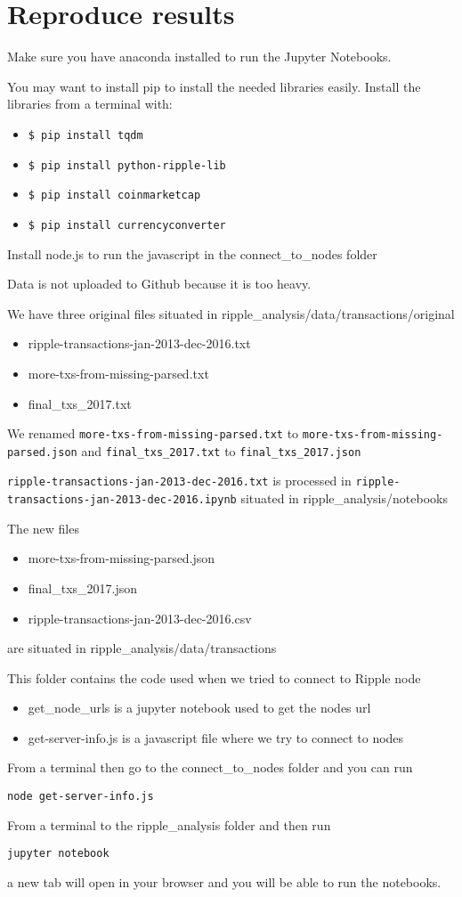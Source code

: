 \section{Reproduce results}
Make sure you have anaconda  installed to run the Jupyter Notebooks.

You may want to install pip  to install the needed libraries easily.
Install the libraries from a terminal with:
\begin{itemize}
\item \texttt{\$ pip install tqdm}
\item \texttt{\$ pip install python-ripple-lib}
\item \texttt{\$ pip install coinmarketcap}
\item \texttt{\$ pip install currencyconverter}
\end{itemize}

Install node.js  to run the javascript in the connect\_to\_nodes folder

Data is not uploaded to Github because it is too heavy.

We have three original files situated in ripple\_analysis/data/transactions/original
\begin{itemize}
\item ripple-transactions-jan-2013-dec-2016.txt
\item more-txs-from-missing-parsed.txt
\item final\_txs\_2017.txt
\end{itemize}

We renamed \texttt{more-txs-from-missing-parsed.txt} to \texttt{more-txs-from-missing-parsed.json} and \texttt{final\_txs\_2017.txt} to \texttt{final\_txs\_2017.json}

\texttt{ripple-transactions-jan-2013-dec-2016.txt} is processed in \texttt{ripple-transactions-jan-2013-dec-2016.ipynb} situated in ripple\_analysis/notebooks

The new files
\begin{itemize}
\item more-txs-from-missing-parsed.json
\item final\_txs\_2017.json
\item ripple-transactions-jan-2013-dec-2016.csv
\end{itemize}
are situated in ripple\_analysis/data/transactions

This folder contains the code used when we tried to connect to Ripple node
\begin{itemize}
\item get\_node\_urls is a jupyter notebook used to get the nodes url
\item get-server-info.js is a javascript file where we try to connect to nodes
\end{itemize}

From a terminal then go to the connect\_to\_nodes folder and you can run

\texttt{node get-server-info.js}

From a terminal to the ripple\_analysis folder and then run

\texttt{jupyter notebook}

a new tab will open in your browser and you will be able to run the notebooks.
